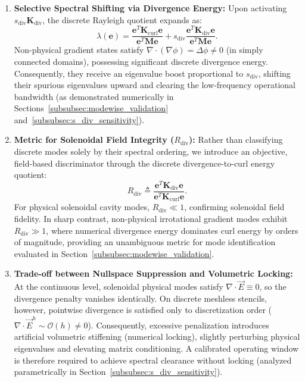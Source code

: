 \documentclass[preprint,12pt]{elsarticle}
\begin{document}
\begin{enumerate}
    \item \textbf{Selective Spectral Shifting via Divergence Energy:} Upon activating $s_{\mathrm{div}} \mathbf{K}_{\mathrm{div}}$, the discrete Rayleigh quotient expands as:
          \begin{equation}
              \lambda(\mathbf{e}) = \frac{\mathbf{e}^T \mathbf{K}_{\mathrm{curl}} \mathbf{e}}{\mathbf{e}^T \mathbf{M} \mathbf{e}} + s_{\mathrm{div}} \frac{\mathbf{e}^T \mathbf{K}_{\mathrm{div}} \mathbf{e}}{\mathbf{e}^T \mathbf{M} \mathbf{e}}.
              \label{eq:rayleigh_penalty_expansion}
          \end{equation}
          Non-physical gradient states satisfy $\nabla \cdot (\nabla \phi) = \Delta \phi \neq 0$ (in simply connected domains), possessing significant discrete divergence energy. Consequently, they receive an eigenvalue boost proportional to $s_{\mathrm{div}}$, shifting their spurious eigenvalues upward and clearing the low-frequency operational bandwidth (as demonstrated numerically in Sections~\ref{subsubsec:modewise_validation} and~\ref{subsubsec:s_div_sensitivity}).
    \item \textbf{Metric for Solenoidal Field Integrity ($R_{\mathrm{div}}$):} Rather than classifying discrete modes solely by their spectral ordering, we introduce an objective, field-based discriminator through the discrete divergence-to-curl energy quotient:
          \begin{equation}
              R_{\mathrm{div}} \triangleq \frac{\mathbf{e}^T \mathbf{K}_{\mathrm{div}} \mathbf{e}}{\mathbf{e}^T \mathbf{K}_{\mathrm{curl}} \mathbf{e}}.
              \label{eq:R_div_ratio_def}
          \end{equation}
          For physical solenoidal cavity modes, $R_{\mathrm{div}} \ll 1$, confirming solenoidal field fidelity. In sharp contrast, non-physical irrotational gradient modes exhibit $R_{\mathrm{div}} \gg 1$, where numerical divergence energy dominates curl energy by orders of magnitude, providing an unambiguous metric for mode identification evaluated in Section~\ref{subsubsec:modewise_validation}.
    \item \textbf{Trade-off between Nullspace Suppression and Volumetric Locking:} At the continuous level, solenoidal physical modes satisfy $\nabla \cdot \vec{E} \equiv 0$, so the divergence penalty vanishes identically. On discrete meshless stencils, however, pointwise divergence is satisfied only to discretization order ($\nabla \cdot \vec{E}^h \sim \mathcal{O}(h) \neq 0$). Consequently, excessive penalization introduces artificial volumetric stiffening (numerical locking), slightly perturbing physical eigenvalues and elevating matrix conditioning. A calibrated operating window is therefore required to achieve spectral clearance without locking (analyzed parametrically in Section~\ref{subsubsec:s_div_sensitivity}).
\end{enumerate}
\end{document}
